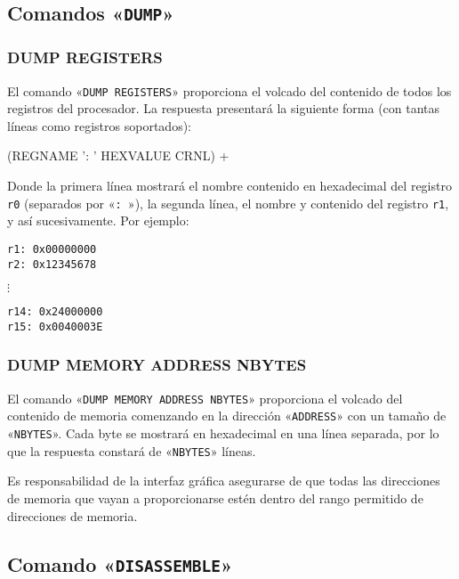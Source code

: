 \documentclass[notitlepage,11pt,a4paper,final,twoside]{article}
\begin{document}
\subsection{Comandos «\texttt{DUMP}»}

\subsubsection{DUMP REGISTERS}

El comando «\texttt{DUMP REGISTERS}» proporciona el volcado del
contenido de todos los registros del procesador. La respuesta
presentará la siguiente forma (con tantas líneas como registros
soportados):

\begin{rail}
  (REGNAME ': ' HEXVALUE CRNL) +
\end{rail}

Donde la primera línea mostrará el nombre contenido en hexadecimal del
registro \texttt{r0} (separados por «\texttt{: }»), la segunda línea,
el nombre y contenido del registro \texttt{r1}, y así
sucesivamente. Por ejemplo:

\begin{lstlisting}
r1: 0x00000000
r2: 0x12345678
\end{lstlisting}

\hspace{6ex}$\vdots$

\lstset{firstnumber=14}
\begin{lstlisting}
r14: 0x24000000
r15: 0x0040003E
\end{lstlisting}
\lstset{firstnumber=1}

\subsubsection{DUMP MEMORY ADDRESS NBYTES}

El comando «\texttt{DUMP MEMORY ADDRESS NBYTES}» proporciona el
volcado del contenido de memoria comenzando en la dirección
«\texttt{ADDRESS}» con un tamaño de «\texttt{NBYTES}». Cada byte se
mostrará en hexadecimal en una línea separada, por lo que la respuesta
constará de «\texttt{NBYTES}» líneas.

Es responsabilidad de la interfaz gráfica asegurarse de que todas las
direcciones de memoria que vayan a proporcionarse estén dentro del
rango permitido de direcciones de memoria.

\subsection{Comando «\texttt{DISASSEMBLE}»}
\end{document}
